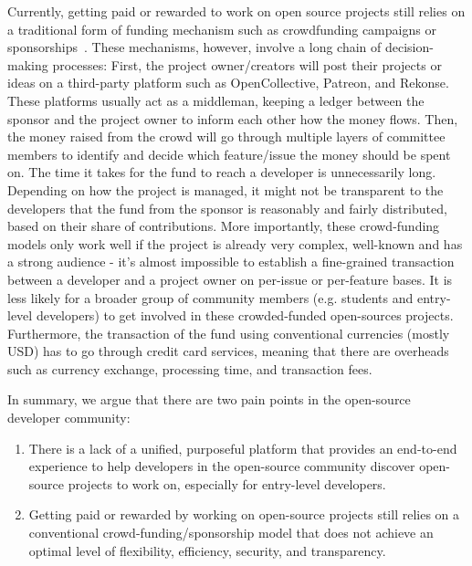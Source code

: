 \documentclass[12pt]{article}
\renewcommand{\_}{\kern-1.5pt\textunderscore\kern-1.5pt}
\begin{document}
Currently, getting paid or rewarded to work on open source projects still relies on a traditional form of funding
mechanism such as crowdfunding campaigns or sponsorships~\cite{open_source_guides}. These mechanisms, however,
involve a long chain of decision-making processes: First, the project owner/creators will post their projects
or ideas on a third-party platform such as OpenCollective, Patreon, and Rekonse. These platforms usually act
as a middleman, keeping a ledger between the sponsor and the project owner to inform each other how the money
flows. Then, the money raised from the crowd will go through multiple layers of committee members to identify
and decide which feature/issue the money should be spent on. The time it takes for the fund to reach a developer
is unnecessarily long. Depending on how the project is managed, it might not be transparent to the developers
that the fund from the sponsor is reasonably and fairly distributed, based on their share of contributions. More
importantly, these crowd-funding models only work well if the project is already very complex, well-known and
has a strong audience - it’s almost impossible to establish a fine-grained transaction between a developer and
a project owner on per-issue or per-feature bases. It is less likely for a broader group of community members
(e.g. students and entry-level developers) to get involved in these crowded-funded open-sources projects.
Furthermore, the transaction of the fund using conventional currencies (mostly USD) has to go through credit
card services, meaning that there are overheads such as currency exchange, processing time, and transaction fees.

In summary, we argue that there are two pain points in the open-source developer community:

\begin{enumerate}

	\item There is a lack of a unified, purposeful platform that provides an end-to-end experience to
	      help developers in the open-source community discover open-source projects to work on, especially
	      for entry-level developers.

	\item Getting paid or rewarded by working on open-source projects still relies on a conventional
	      crowd-funding/sponsorship model that does not achieve an optimal level of flexibility, efficiency,
	      security, and transparency.

\end{enumerate}
\end{document}
